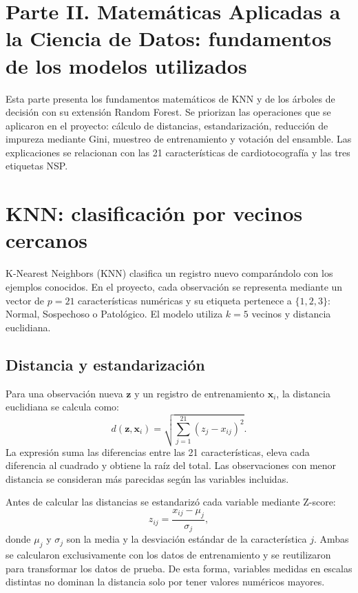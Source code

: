 \newpage
\section*{Parte II. Matem\'aticas Aplicadas a la Ciencia de Datos: fundamentos de los modelos utilizados}
\setcounter{section}{0}
\setcounter{subsection}{0}
Esta parte presenta los fundamentos matem\'aticos de KNN y de los \'arboles de decisi\'on con su extensi\'on Random Forest. Se priorizan las operaciones que se aplicaron en el proyecto: c\'alculo de distancias, estandarizaci\'on, reducci\'on de impureza mediante Gini, muestreo de entrenamiento y votaci\'on del ensamble. Las explicaciones se relacionan con las 21 caracter\'isticas de cardiotocograf\'ia y las tres etiquetas NSP.

\section{KNN: clasificaci\'on por vecinos cercanos}
K-Nearest Neighbors (KNN) clasifica un registro nuevo compar\'andolo con los ejemplos conocidos. En el proyecto, cada observaci\'on se representa mediante un vector de $p=21$ caracter\'isticas num\'ericas y su etiqueta pertenece a $\{1,2,3\}$: Normal, Sospechoso o Patol\'ogico. El modelo utiliza $k=5$ vecinos y distancia euclidiana.

\subsection{Distancia y estandarizaci\'on}
Para una observaci\'on nueva $\mathbf{z}$ y un registro de entrenamiento $\mathbf{x}_i$, la distancia euclidiana se calcula como:
\begin{equation}
d(\mathbf{z},\mathbf{x}_i)=\sqrt{\sum_{j=1}^{21}(z_j-x_{ij})^2}.
\end{equation}
La expresi\'on suma las diferencias entre las 21 caracter\'isticas, eleva cada diferencia al cuadrado y obtiene la ra\'iz del total. Las observaciones con menor distancia se consideran m\'as parecidas seg\'un las variables incluidas.

Antes de calcular las distancias se estandariz\'o cada variable mediante Z-score:
\begin{equation}
z_{ij}=\frac{x_{ij}-\mu_j}{\sigma_j},
\end{equation}
donde $\mu_j$ y $\sigma_j$ son la media y la desviaci\'on est\'andar de la caracter\'istica $j$. Ambas se calcularon exclusivamente con los datos de entrenamiento y se reutilizaron para transformar los datos de prueba. De esta forma, variables medidas en escalas distintas no dominan la distancia solo por tener valores num\'ericos mayores.

